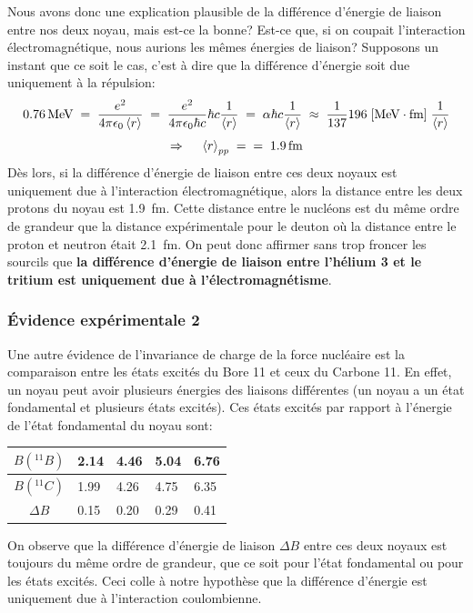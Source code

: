 Nous avons donc une explication plausible de la différence d'énergie de liaison entre nos deux noyau, mais est-ce la bonne? Est-ce que, si on coupait l'interaction électromagnétique, nous aurions les mêmes énergies de liaison? Supposons un instant que ce soit le cas, c'est à dire que la différence d'énergie soit due uniquement à la répulsion:
\[
    \SI{0.76}{MeV} \eq
    \dfrac{e^2}{4\pi\epsilon_0\expval{r}}
    \eq \dfrac{e^2}{4\pi\epsilon_0\hbar c}\hbar c\dfrac{1}{\expval{r}}
    \eq \alpha \hbar c \dfrac{1}{\expval{r}}
    \;\approx\; \dfrac{1}{137} 196\; [\si{MeV \cdot fm}] \; \dfrac{1}{\expval{r}}
\]
\[
    \Rightarrow \quad  \; \expval{r}_{pp} \eq \eq \SI{1.9}{fm}
\]
Dès lors, si la différence d'énergie de liaison entre ces deux noyaux est uniquement due à l'interaction électromagnétique, alors la distance entre les deux protons du noyau est \SI{1.9}{fm}. Cette distance entre le nucléons est du même ordre de grandeur que la distance expérimentale pour le deuton où la distance entre le proton et neutron était \SI{2.1}{fm}. On peut donc affirmer sans trop froncer les sourcils que \textbf{la différence d'énergie de liaison entre l'hélium 3 et le tritium est uniquement due à l'électromagnétisme}.


\subsubsection{Évidence expérimentale 2} \label{Evid_exp2}


Une autre évidence de l'invariance de charge de la force nucléaire est la comparaison entre les états excités du Bore 11 et ceux du Carbone 11. En effet, un noyau peut avoir plusieurs énergies des liaisons différentes (un noyau a un état fondamental et plusieurs états excités). Ces états excités par rapport à l'énergie de l'état fondamental du noyau sont:
\begin{center}
\begin{tabular}{|c|p{0.7cm}|p{0.7cm}|p{0.7cm}|p{0.7cm}|}
    \hline
	$B(^{11}B)$& 2.14 & 4.46 & 5.04 & 6.76\\
	\hline
	$B(^{11}C)$& 1.99 & 4.26 & 4.75 & 6.35\\
	\hline
	$\Delta B$ & 0.15 & 0.20 & 0.29 & 0.41\\
	\hline
\end{tabular}
\end{center}
On observe que la différence d'énergie de liaison $\Delta B$ entre ces deux noyaux est toujours du même ordre de grandeur, que ce soit pour l'état fondamental ou pour les états excités. Ceci colle à notre hypothèse que la différence d'énergie est uniquement due à l'interaction coulombienne.

